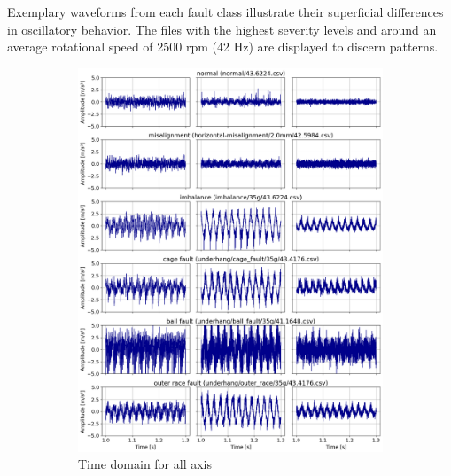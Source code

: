 Exemplary waveforms from each fault class illustrate their
superficial differences in oscillatory behavior. The files with the highest severity levels and around an average rotational speed of 2500 rpm (42 Hz) are displayed to discern patterns.
\begin{figure}[h]
    \centering
    \begin{subfigure}[b]{0.48\textwidth}
        \includegraphics[width=\textwidth]{assets/results/eda/mafaulda-TD-A.png}
        \caption{Time domain for all axis}
        \label{fig:design:fault-temporal-waveform}
    \end{subfigure}
    \hfill
    \begin{subfigure}[b]{0.50\textwidth}

\end{subfigure}
\end{figure}
